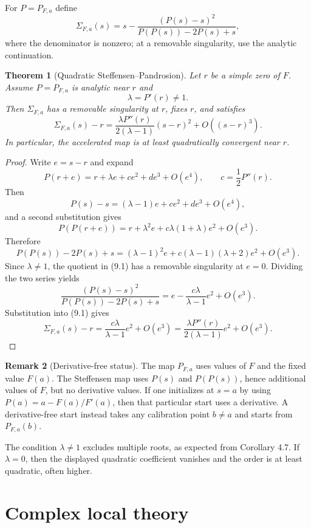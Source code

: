 \documentclass[11pt]{article}
\newtheorem{theorem}{Theorem}[section]
\theoremstyle{definition}
\newtheorem{remark}[theorem]{Remark}
\begin{document}
For $P=P_{F,a}$ define
\[
        \Sigma_{F,a}(s)
        =s-\frac{(P(s)-s)^2}{P(P(s))-2P(s)+s},
        \tag{9.1}
\]
where the denominator is nonzero; at a removable singularity, use the analytic continuation.

\begin{theorem}[Quadratic Steffensen--Pandrosion]
Let $r$ be a simple zero of $F$.  Assume $P=P_{F,a}$ is analytic near $r$ and
\[
        \lambda=P'(r)\ne1.
\]
Then $\Sigma_{F,a}$ has a removable singularity at $r$, fixes $r$, and satisfies
\[
        \Sigma_{F,a}(s)-r
        =\frac{\lambda P''(r)}{2(\lambda-1)}(s-r)^2
        +O((s-r)^3).
        \tag{9.2}
\]
In particular, the accelerated map is at least quadratically convergent near $r$.
\end{theorem}

\begin{proof}
Write $e=s-r$ and expand
\[
        P(r+e)=r+\lambda e+c e^2+d e^3+O(e^4),
        \qquad c=\frac12P''(r).
\]
Then
\[
        P(s)-s=(\lambda-1)e+c e^2+d e^3+O(e^4),
\]
and a second substitution gives
\[
        P(P(r+e))=r+\lambda^2e+c\lambda(1+\lambda)e^2+O(e^3).
\]
Therefore
\[
        P(P(s))-2P(s)+s=(\lambda-1)^2e+c(\lambda-1)(\lambda+2)e^2+O(e^3).
\]
Since $\lambda\ne1$, the quotient in (9.1) has a removable singularity at $e=0$.  Dividing the two series yields
\[
        \frac{(P(s)-s)^2}{P(P(s))-2P(s)+s}
        =e-\frac{c\lambda}{\lambda-1}e^2+O(e^3).
\]
Substitution into (9.1) gives
\[
        \Sigma_{F,a}(s)-r=\frac{c\lambda}{\lambda-1}e^2+O(e^3)
        =\frac{\lambda P''(r)}{2(\lambda-1)}e^2+O(e^3).
\]
\end{proof}

\begin{remark}[Derivative-free status]
The map $P_{F,a}$ uses values of $F$ and the fixed value $F(a)$.  The Steffensen map uses $P(s)$ and $P(P(s))$, hence additional values of $F$, but no derivative values.  If one initializes at $s=a$ by using $P(a)=a-F(a)/F'(a)$, then that particular start uses a derivative.  A derivative-free start instead takes any calibration point $b\ne a$ and starts from $P_{F,a}(b)$.
\end{remark}

The condition $\lambda\ne1$ excludes multiple roots, as expected from Corollary 4.7.  If $\lambda=0$, then the displayed quadratic coefficient vanishes and the order is at least quadratic, often higher.

\section{Complex local theory}
\end{document}
